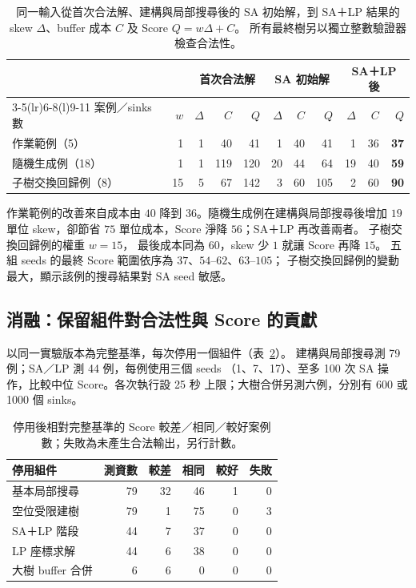 \documentclass[12pt,a4paper]{article}
\newcommand{\rDelta}{\Delta}
\newcommand{\rScore}{Q}
\newcommand{\rCost}{C}
\begin{document}
\begin{table}[htbp]
\centering
\setlength{\tabcolsep}{5pt}
\begin{tabular}{@{}l r rrr rrr rr>{\bfseries}r@{}}
\toprule
 & & \multicolumn{3}{c}{首次合法解} & \multicolumn{3}{c}{SA 初始解}
 & \multicolumn{3}{c}{SA＋LP 後}\\
\cmidrule(lr){3-5}\cmidrule(lr){6-8}\cmidrule(l){9-11}
案例／sinks 數 & $w$ & $\rDelta$ & $\rCost$ & $\rScore$ & $\rDelta$ & $\rCost$ & $\rScore$
 & $\rDelta$ & $\rCost$ & $\rScore$\\
\midrule
作業範例（5） & 1 & 1 & 40 & 41 & 1 & 40 & 41 & 1 & 36 & 37\\
隨機生成例（18） & 1 & 1 & 119 & 120 & 20 & 44 & 64 & 19 & 40 & 59\\
子樹交換回歸例（8） & 15 & 5 & 67 & 142 & 3 & 60 & 105 & 2 & 60 & 90\\
\bottomrule
\end{tabular}
\caption{同一輸入從首次合法解、建構與局部搜尋後的 SA 初始解，到 SA＋LP
結果的 skew $\rDelta$、buffer 成本 $\rCost$ 及 Score $\rScore=w\rDelta+\rCost$。
所有最終樹另以獨立整數驗證器檢查合法性。}
\label{tab:stages}
\end{table}

作業範例的改善來自成本由 $40$ 降到 $36$。隨機生成例在建構與局部搜尋後增加 $19$
單位 skew，卻節省 $75$ 單位成本，Score 淨降 $56$；SA＋LP 再改善兩者。
子樹交換回歸例的權重 $w=15$，
最後成本同為 $60$，skew 少 $1$ 就讓 Score 再降 $15$。
五組 seeds 的最終 Score 範圍依序為 $37$、$54$--$62$、$63$--$105$；
子樹交換回歸例的變動最大，顯示該例的搜尋結果對 SA seed 敏感。

\subsection{消融：保留組件對合法性與 Score 的貢獻}
以同一實驗版本為完整基準，每次停用一個組件（表~\ref{tab:ablation}）。
建構與局部搜尋測 79 例；SA／LP 測 44 例，每例使用三個 seeds
（1、7、17）、至多 100 次 SA 操作，比較中位 Score。各次執行設 25 秒
上限；大樹合併另測六例，分別有 600 或 1000 個 sinks。
\begin{table}[htbp]
\centering
\begin{tabular}{@{}lrrrrr@{}}
\toprule
停用組件 & 測資數 & 較差 & 相同 & 較好 & 失敗\\
\midrule
基本局部搜尋 & 79 & 32 & 46 & 1 & 0\\
空位受限建樹 & 79 & 1 & 75 & 0 & 3\\
SA＋LP 階段 & 44 & 7 & 37 & 0 & 0\\
LP 座標求解 & 44 & 6 & 38 & 0 & 0\\
大樹 buffer 合併 & 6 & 6 & 0 & 0 & 0\\
\bottomrule
\end{tabular}
\caption{停用後相對完整基準的 Score 較差／相同／較好案例數；失敗為未產生合法輸出，另行計數。}
\label{tab:ablation}
\end{table}
\end{document}
